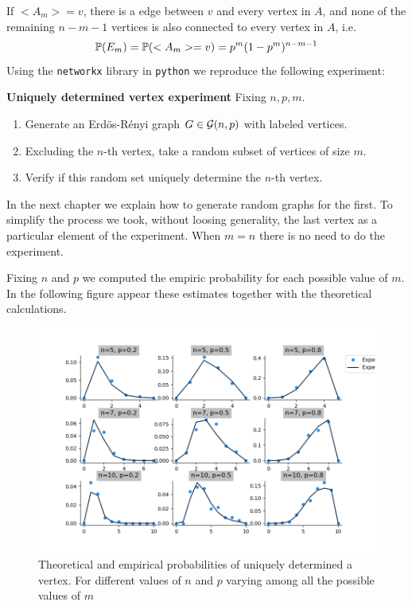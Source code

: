 If $<A_{m}> = v$, there is a edge between $v$ and every vertex in $A$, and none of the remaining $n-m-1$ vertices is also connected to every vertex in $A$, i.e.
$$\P (E_m) = \P(<A_{m}> = v) = p^{m}(1-p^{m})^{n-m-1}$$
Using the \texttt{networkx} library in \texttt{python} we reproduce the following experiment:

\begin{cajita}
\textbf{Uniquely determined vertex experiment} \hfill \break
Fixing $n,p,m$.
\begin{enumerate}
\item Generate an Erdös-Rényi graph $G\in \G(n,p)$ with labeled vertices.
\item Excluding the $n$-th vertex, take a random subset of vertices of size $m$.
\item Verify if this random set uniquely determine the $n$-th vertex.
\end{enumerate}
\end{cajita}

In the next chapter we explain how to generate random graphs for the first. To simplify the process we took, without loosing generality, the last vertex as a particular element of the experiment. When $m=n$ there is no need to do the experiment.

Fixing $n$ and $p$ we computed the empiric probability for each possible value of $m$. In the following figure appear these estimates together with the theoretical calculations.

\begin{figure}[h!]
	\centering
	\includegraphics[scale=0.55]{Python/Figures/Uniquely-determinated-fixed-vertex.png}
	\caption{Theoretical and empirical probabilities of uniquely determined a vertex. For different values of $n$ and $p$ varying among all the possible values of $m$}
\end{figure}

